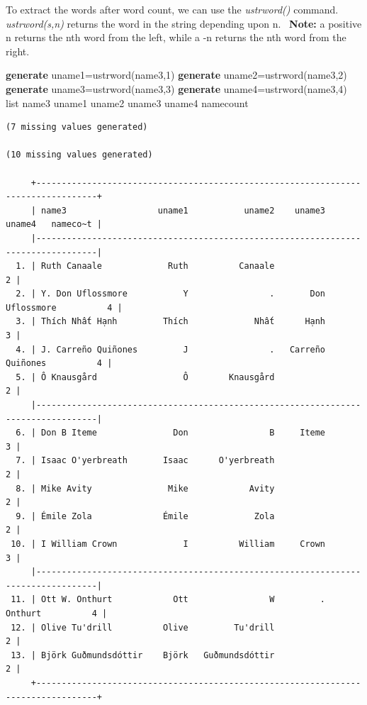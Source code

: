 \documentclass[
]{book}
\newenvironment{Shaded}{\begin{snugshade}}{\end{snugshade}}
\newcommand{\KeywordTok}[1]{\textcolor[rgb]{0.13,0.29,0.53}{\textbf{#1}}}
\newcommand{\NormalTok}[1]{#1}
\newcommand{\OtherTok}[1]{\textcolor[rgb]{0.56,0.35,0.01}{#1}}
\begin{document}
To extract the words after word count, we can use the \emph{ustrword()} command.
\emph{ustrword(s,n)} returns the word in the string depending upon n.~
\textbf{Note:} a positive n returns the nth word from the left, while a -n returns the nth word from the right.

\begin{Shaded}
\begin{Highlighting}[]
    \KeywordTok{generate}\NormalTok{ uname1=ustrword(name3,1)}
    \KeywordTok{generate}\NormalTok{ uname2=ustrword(name3,2)}
    \KeywordTok{generate}\NormalTok{ uname3=ustrword(name3,3)}
    \KeywordTok{generate}\NormalTok{ uname4=ustrword(name3,4)}
    \OtherTok{list}\NormalTok{ name3 uname1 uname2 uname3 uname4 namecount}
\end{Highlighting}
\end{Shaded}

\begin{verbatim}
(7 missing values generated)

(10 missing values generated)

     +----------------------------------------------------------------------------------+
     | name3                  uname1           uname2    uname3       uname4   nameco~t |
     |----------------------------------------------------------------------------------|
  1. | Ruth Canaale             Ruth          Canaale                                 2 |
  2. | Y. Don Uflossmore           Y                .       Don   Uflossmore          4 |
  3. | Thích Nhất Hạnh         Thích             Nhất      Hạnh                       3 |
  4. | J. Carreño Quiñones         J                .   Carreño     Quiñones          4 |
  5. | Ô Knausgård                 Ô        Knausgård                                 2 |
     |----------------------------------------------------------------------------------|
  6. | Don B Iteme               Don                B     Iteme                       3 |
  7. | Isaac O'yerbreath       Isaac      O'yerbreath                                 2 |
  8. | Mike Avity               Mike            Avity                                 2 |
  9. | Émile Zola              Émile             Zola                                 2 |
 10. | I William Crown             I          William     Crown                       3 |
     |----------------------------------------------------------------------------------|
 11. | Ott W. Onthurt            Ott                W         .      Onthurt          4 |
 12. | Olive Tu'drill          Olive         Tu'drill                                 2 |
 13. | Björk Guðmundsdóttir    Björk   Guðmundsdóttir                                 2 |
     +----------------------------------------------------------------------------------+
\end{verbatim}
\end{document}
